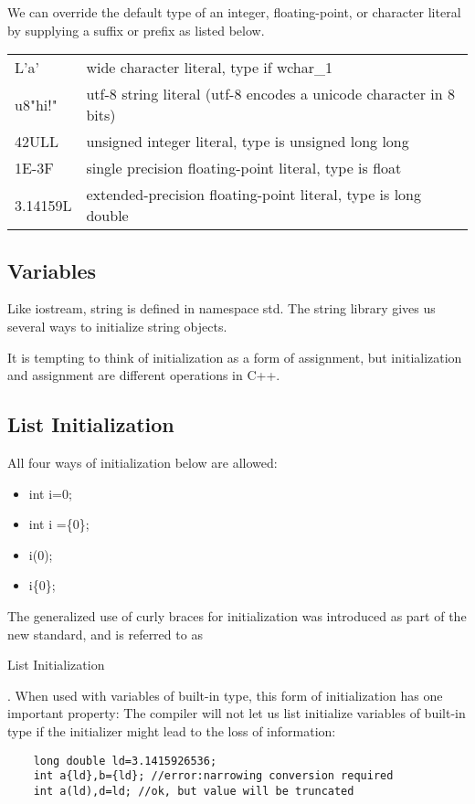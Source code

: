 \documentclass[UTF8]{ctexart}
\newcommand \qd[1] {\begin{qds} {#1} \end{qds}}
\begin{document}
We can override the default type of an integer, floating-point, or character literal by supplying a suffix or prefix as listed below.

\begin{table}[H]
	\centering
	\begin{tabular}{|l|l|}
		\hline
		L'a'  & wide character literal, type if wchar\_1  \\
		u8"hi!"& utf-8 string literal (utf-8 encodes a unicode character in 8 bits) \\
		42ULL & unsigned integer literal, type is unsigned long long \\
		1E-3F & single precision floating-point literal, type is float \\
		3.14159L & extended-precision floating-point literal, type is long double \\
		\hline
	\end{tabular}%
\end{table}

\subsection{Variables}

Like iostream, string is defined in namespace std. The string library gives us several ways to initialize string objects. 

It is tempting to think of initialization as a form of assignment, but initialization and assignment are different operations in C++.

\subsection{List Initialization}
All four ways of initialization below are allowed:
\begin{itemize}
	\item{int i=0;}
	\item{int i =\{0\};}
	\item{i(0);}
	\item{i\{0\};}
\end{itemize}

The generalized use of curly braces for initialization was introduced as part of the new standard, and is referred to as \qd{List Initialization}. When used with variables of built-in type, this form of initialization has one important property: The compiler will not let us list initialize variables of built-in type if the initializer might lead to the loss of information:
\begin{lstlisting}
	long double ld=3.1415926536;
	int a{ld},b={ld}; //error:narrowing conversion required
	int a(ld),d=ld; //ok, but value will be truncated
\end{lstlisting}
\end{document}

